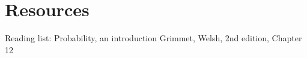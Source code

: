 \documentclass[a4paper]{article}
\begin{document}
\section{Resources}


Reading list: Probability, an introduction Grimmet, Welsh, 2nd edition, Chapter 12

\fi
\end{document}
